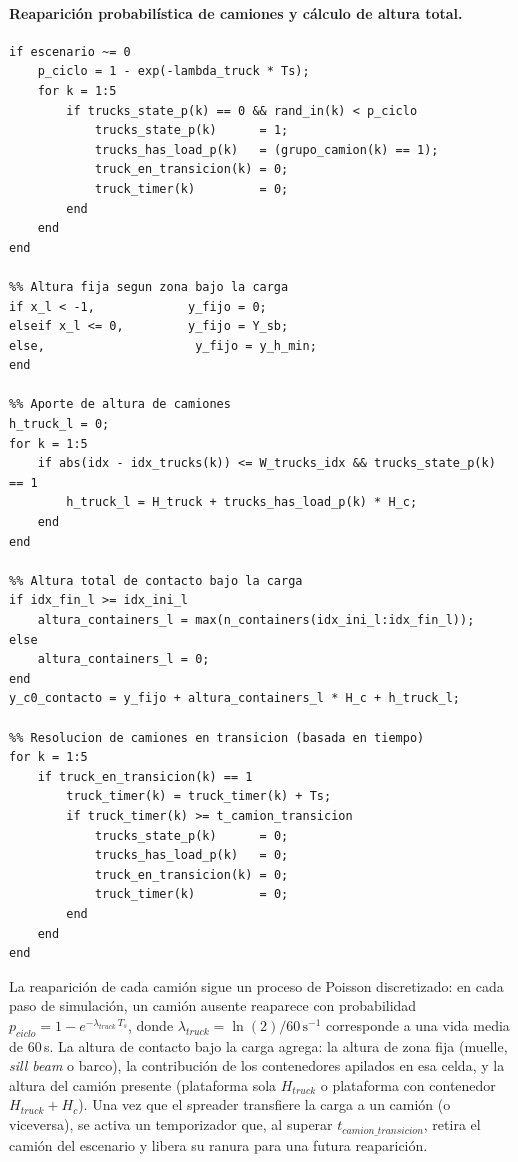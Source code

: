 \documentclass[12pt, a4paper]{article}
\begin{document}
\paragraph{Reaparición probabilística de camiones y cálculo de altura total.}\leavevmode

\begin{lstlisting}[style=matlab, caption={Reaparición de camiones, altura de contacto y resolución de transiciones.}, label=lst:perfil-suelo-altura]
%% Reaparicion probabilistica de camiones
if escenario ~= 0
    p_ciclo = 1 - exp(-lambda_truck * Ts);
    for k = 1:5
        if trucks_state_p(k) == 0 && rand_in(k) < p_ciclo
            trucks_state_p(k)      = 1;
            trucks_has_load_p(k)   = (grupo_camion(k) == 1);
            truck_en_transicion(k) = 0;
            truck_timer(k)         = 0;
        end
    end
end

%% Altura fija segun zona bajo la carga
if x_l < -1,             y_fijo = 0;
elseif x_l <= 0,         y_fijo = Y_sb;
else,                     y_fijo = y_h_min;
end

%% Aporte de altura de camiones
h_truck_l = 0;
for k = 1:5
    if abs(idx - idx_trucks(k)) <= W_trucks_idx && trucks_state_p(k) == 1
        h_truck_l = H_truck + trucks_has_load_p(k) * H_c;
    end
end

%% Altura total de contacto bajo la carga
if idx_fin_l >= idx_ini_l
    altura_containers_l = max(n_containers(idx_ini_l:idx_fin_l));
else
    altura_containers_l = 0;
end
y_c0_contacto = y_fijo + altura_containers_l * H_c + h_truck_l;

%% Resolucion de camiones en transicion (basada en tiempo)
for k = 1:5
    if truck_en_transicion(k) == 1
        truck_timer(k) = truck_timer(k) + Ts;
        if truck_timer(k) >= t_camion_transicion
            trucks_state_p(k)      = 0;
            trucks_has_load_p(k)   = 0;
            truck_en_transicion(k) = 0;
            truck_timer(k)         = 0;
        end
    end
end
\end{lstlisting}

La reaparición de cada camión sigue un proceso de Poisson discretizado: en cada paso
de simulación, un camión ausente reaparece con probabilidad
$p_{ciclo} = 1 - e^{-\lambda_{truck}\,T_s}$, donde $\lambda_{truck} = \ln(2)/60\,\text{s}^{-1}$
corresponde a una vida media de 60\,s. La altura de contacto bajo la carga agrega:
la altura de zona fija (muelle, \textit{sill beam} o barco), la contribución de los
contenedores apilados en esa celda, y la altura del camión presente (plataforma sola
$H_{truck}$ o plataforma con contenedor $H_{truck}+H_c$). Una vez que el spreader
transfiere la carga a un camión (o viceversa), se activa un temporizador que, al
superar $t_{camion\_transicion}$, retira el camión del escenario y libera su ranura
para una futura reaparición.
\end{document}
